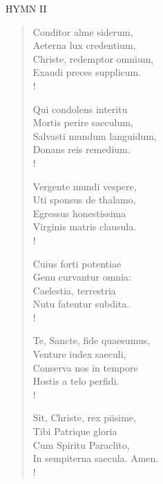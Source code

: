 \noindent\small{\uppercase{Hymn II }}\normalsize\label{advent:lastHymn} 
\begin{verse}
Conditor alme siderum,\\
Aeterna lux credentium,\\
Christe, redemptor omnium,\\
Exaudi preces supplicum.\\!

Qui condolens interitu\\
Mortis perire saeculum,\\
Salvasti mundum languidum,\\
Donans reis remedium.\\!

Vergente mundi vespere,\\
Uti sponsus de thalamo,\\
Egressus honestissima\\
Virginis matris clausula.\\!

Cuius forti potentiae\\
Genu curvantur omnia:\\
Caelestia, terrestria\\
Nutu fatentur subdita.\\!

Te, Sancte, fide quaesumus,\\
Venture iudex saeculi,\\
Conserva nos in tempore\\
Hostis a telo perfidi.\\!

Sit, Christe, rex piisime,\\
Tibi Patrique gloria\\
Cum Spiritu Paraclito,\\
In sempiterna saecula. Amen.\\!
\end{verse}

